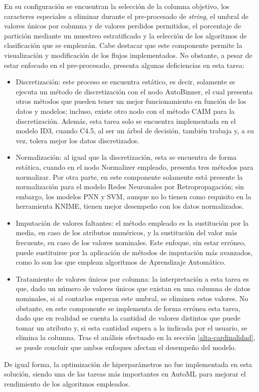 En su configuración se encuentran la selección de la columna objetivo, los caracteres especiales a eliminar durante el pre-procesado de \textit{string}, el umbral de valores únicos por columna y de valores perdidos permitidos, el porcentaje de partición mediante un muestreo estratificado y la selección de los algoritmos de clasificación que se emplearán. Cabe destacar que este componente permite la visualización y modificación de los flujos implementados. No obstante, a pesar de estar enfocado en el pre-procesado, presenta algunas deficiencias en esta tarea:
\begin{itemize}
	\item Discretización: este proceso se encuentra estático, es decir, solamente se ejecuta un método de discretización con el nodo AutoBinner, el cual presenta otros métodos que pueden tener un mejor funcionamiento en función de los datos y modelos; incluso, existe otro nodo con el método CAIM para la discretización. Además, esta tarea solo se encuentra implementada en el modelo ID3, cuando C4.5, al ser un árbol de decisión, también trabaja y, a su vez, tolera mejor los datos discretizados.
	\item Normalización: al igual que la discretización, esta se encuentra de forma estática, cuando en el nodo Normalizer empleado, presenta tres métodos para normalizar. Por otra parte, en este componente solamente está presente la normalización para el modelo Redes Neuronales por Retropropagación; sin embargo, los modelos PNN y SVM, aunque no lo tienen como requisito en la herramienta KNIME, tienen mejor desempeño con los datos normalizados.
	\item Imputación de valores faltantes: el método empleado es la sustitución por la media, en caso de los atributos numéricos, y la sustitución del valor más frecuente, en caso de los valores nominales. Este enfoque, sin estar erróneo, puede sustituirse por la aplicación de métodos de imputación más avanzados, como lo son los que emplean algoritmos de Aprendizaje Automático.
	\item Tratamiento de valores únicos por columna: la interpretación a esta tarea es que, dado un número de valores únicos que existan en una columna de datos nominales, si al contarlos superan este umbral, se eliminen estos valores. No obstante, en este componente se implementa de forma errónea esta tarea, dado que en realidad se cuenta la cantidad de valores distintos que puede tomar un atributo y, si esta cantidad supera a la indicada por el usuario, se elimina la columna. Tras el análisis efectuado en la sección \ref{alta-cardinalidad}, se puede concluir que ambos enfoques afectan el desempeño del modelo.
\end{itemize}
De igual forma, la optimización de hiperparámetros no fue implementada en esta solución, siendo una de las tareas más importantes en AutoML para mejorar el rendimiento de los algoritmos empleados.

